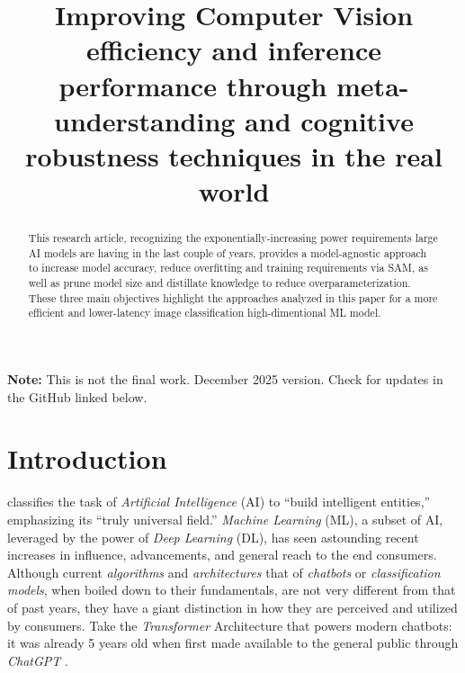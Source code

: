 \documentclass[conference]{IEEEtran}
\begin{document}
\title{\bfseries Improving Computer Vision efficiency and inference performance through meta-understanding and cognitive robustness techniques in the real world }

\author{
}

\maketitle

\begin{abstract}
This research article, recognizing the exponentially-increasing power requirements large AI models are having in the last couple of years, provides a model-agnostic approach to increase model accuracy, reduce overfitting and training requirements via SAM, as well as prune model size and distillate knowledge to reduce overparameterization. These three main objectives highlight the approaches analyzed in this paper for a more efficient and lower-latency image classification high-dimentional ML model.
\end{abstract}

\IEEEpeerreviewmaketitle



\textbf{Note:} This is not the final work. December 2025 version. Check for updates in the GitHub linked below.

\section{Introduction} \label{introduction}

\cite{aima2021} classifies the task of \textit{Artificial Intelligence} (AI) to ``build intelligent entities,'' emphasizing its ``truly universal field.'' \textit{Machine Learning} (ML), a subset of AI, leveraged by the power of \textit{Deep Learning} (DL), has seen astounding recent increases in influence, advancements, and general reach to the end consumers. Although current \textit{algorithms} and \textit{architectures} that of \textit{chatbots} or \textit{classification models}, when boiled down to their fundamentals, are not very different from that of past years, they have a giant distinction in how they are perceived and utilized by consumers. Take the \textit{Transformer} Architecture that powers modern chatbots: it was already 5 years old when first made available to the general public through \textit{ChatGPT} \cite{attention2017, chatgpt2022}.
\end{document}
